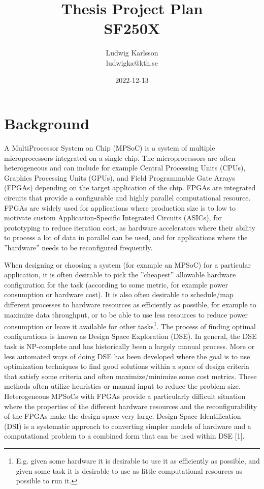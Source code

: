 \documentclass[12pt,notitlepage]{article}
\title{Thesis Project Plan\\SF250X}
\author{Ludwig Karlsson\\ludwigka@kth.se}
\date{2022-12-13}
\begin{document}
\maketitle

\section{Background}
A MultiProcessor System on Chip (MPSoC) is a system of multiple microprocessors integrated on a single chip. The microprocessors are often heterogeneous and can include for example Central Processing Units (CPUs), Graphics Processing Units (GPUs), and Field Programmable Gate Arrays (FPGAs) depending on the target application of the chip. FPGAs are integrated circuits that provide a configurable and highly parallel computational resource. FPGAs are widely used for applications where production size is to low to motivate custom Application-Specific Integrated Circuits (ASICs), for prototyping to reduce iteration cost, as hardware accelerators where their ability to process a lot of data in parallel can be used, and for applications where the ''hardware'' needs to be reconfigured frequently.

When designing or choosing a system (for example an MPSoC) for a particular application, it is often desirable to pick the ''cheapest'' allowable hardware configuration for the task (according to some metric, for example power consumption or hardware cost). It is also often desirable to schedule/map different processes to hardware resources as efficiently as possible, for example to maximize data throughput, or to be able to use less resources to reduce power consumption or leave it available for other tasks\footnote{E.g. given some hardware it is desirable to use it as efficiently as possible, and given some task it is desirable to use as little computational resources as possible to run it.}. The process of finding optimal configurations is known as Design Space Exploration (DSE). In general, the DSE task is NP-complete and has historically been a largely manual process. More or less automated ways of doing DSE has been developed where the goal is to use optimization techniques to find good solutions within a space of design criteria that satisfy some criteria and often maximize/minimize some cost metrics. These methods often utilize heuristics or manual input to reduce the problem size. Heterogeneous MPSoCs with FPGAs provide a particularly difficult situation where the properties of the different hardware resources and the reconfigurability of the FPGAs make the design space very large. Design Space Identification (DSI) is a systematic approach to converting simpler models of hardware and a computational problem to a combined form that can be used within DSE [1].
\end{document}
